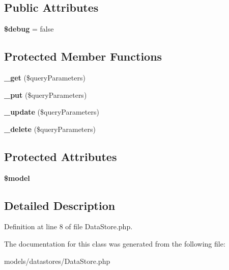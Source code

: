 \subsection*{Public Attributes}
\begin{DoxyCompactItemize}
\item 
\hypertarget{class_data_store_afd3c26ecda279df5d4033f90dd5b380f}{
{\bfseries \$debug} = false}
\label{class_data_store_afd3c26ecda279df5d4033f90dd5b380f}

\end{DoxyCompactItemize}
\subsection*{Protected Member Functions}
\begin{DoxyCompactItemize}
\item 
\hypertarget{class_data_store_afec418873e7f85f2cdd83fa54bf80978}{
{\bfseries \_\-get} (\$queryParameters)}
\label{class_data_store_afec418873e7f85f2cdd83fa54bf80978}

\item 
\hypertarget{class_data_store_ac4243dfbdd80b941ac05a5519b614b5c}{
{\bfseries \_\-put} (\$queryParameters)}
\label{class_data_store_ac4243dfbdd80b941ac05a5519b614b5c}

\item 
\hypertarget{class_data_store_a7754e199439c6170262db2a8c9fe37cf}{
{\bfseries \_\-update} (\$queryParameters)}
\label{class_data_store_a7754e199439c6170262db2a8c9fe37cf}

\item 
\hypertarget{class_data_store_a92fdb4be5160bd461d7f3331fa052b47}{
{\bfseries \_\-delete} (\$queryParameters)}
\label{class_data_store_a92fdb4be5160bd461d7f3331fa052b47}

\end{DoxyCompactItemize}
\subsection*{Protected Attributes}
\begin{DoxyCompactItemize}
\item 
\hypertarget{class_data_store_ab3e643aa5006a5a9bd8a840f85e3d5d9}{
{\bfseries \$model}}
\label{class_data_store_ab3e643aa5006a5a9bd8a840f85e3d5d9}

\end{DoxyCompactItemize}


\subsection{Detailed Description}


Definition at line 8 of file DataStore.php.



The documentation for this class was generated from the following file:\begin{DoxyCompactItemize}
\item 
models/datastores/DataStore.php\end{DoxyCompactItemize}
